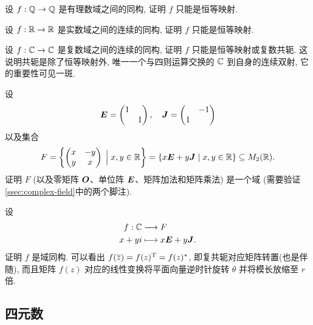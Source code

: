 \begin{subex}
  \item 设 $f:{\mathbb{Q}}\to{\mathbb{Q}}$ 是有理数域之间的同构, 证明 $f$ 只能是恒等映射.
  \item 设 $f:{\mathbb{R}}\to{\mathbb{R}}$ 是实数域之间的连续的同构, 证明 $f$ 只能是恒等映射.
  \item 设 $f:{\mathbb{C}}\to{\mathbb{C}}$ 是复数域之间的连续的同构, 证明 $f$ 只能是恒等映射或复数共轭.
  这说明共轭是除了恒等映射外, 唯一一个与四则运算交换的 ${\mathbb{C}}$ 到自身的连续双射, 它的重要性可见一斑.
  \item 设
  \[
    {\boldsymbol{E}}=\begin{pmatrix}1& \\&1\end{pmatrix},\quad
    {\boldsymbol{J}}=\begin{pmatrix}&-1\\1&\end{pmatrix}
  \]
  以及集合
  \[
    F={\left\{\begin{pmatrix}
    x&-y\\y&x\end{pmatrix}\;\Big|\; x,y\in{\mathbb{R}}\right\}}
    ={\left\{x{\boldsymbol{E}}+y{\boldsymbol{J}}\mid x,y\in{\mathbb{R}}\right\}}\subseteq M_2({\mathbb{R}}).
  \]
  证明 $F$ (以及零矩阵 ${\boldsymbol{O}}$、单位阵 ${\boldsymbol{E}}$、矩阵加法和矩阵乘法) 是一个域 (需要验证 \ref{ssec:complex-field}中的两个脚注).
  \item 设
  \begin{align*}
    f:{\mathbb{C}}&\longrightarrow F\\
    x+yi&\longmapsto x{\boldsymbol{E}}+y{\boldsymbol{J}}.
  \end{align*}
  证明 $f$ 是域同构.
  可以看出 $f(\overline z)=f(z)^{\mathrm{T}}=f(z)^*$, 即复共轭对应矩阵转置(也是伴随), 而且矩阵 $f(z)$ 对应的线性变换将平面向量逆时针旋转 $\theta$ 并将模长放缩至 $r$ 倍.
\end{subex}




\subsection{四元数}

